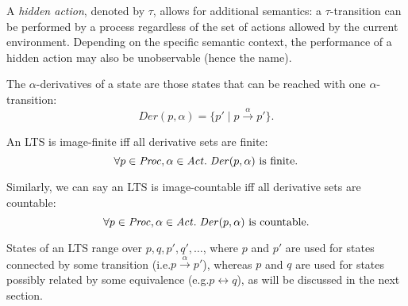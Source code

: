 \begin{isabellebody}
\begin{isamarkuptext}
{}

A \emph{hidden action}, denoted by $\tau$, allows for additional semantics: a $\tau$-transition can be performed by a process regardless of the set of actions allowed by the current environment. Depending on the specific semantic context, the performance of a hidden action may also be unobservable (hence the name).%
\end{isamarkuptext}\isamarkuptrue%
%
\isadelimdocument
%
\endisadelimdocument
%
\isatagdocument
%
\isamarkuptrue%
%
\endisatagdocument
{\isafolddocument}%
%
\isadelimdocument
%
\endisadelimdocument
%
\begin{isamarkuptext}%
The $\alpha$-derivatives of a state are those states that can be reached with one $\alpha$-transition:
$$\mathit{Der}(p, \alpha) = \{ p' \mid p \xrightarrow{\alpha} p' \}.$$

An LTS is image-finite iff all derivative sets are finite:
$$\forall p \in \mathit{Proc}, \alpha \in \mathit{Act} .\; \mathit{Der}(p, \alpha) \text{ is finite}.$$

Similarly, we can say an LTS is image-countable iff all derivative sets are countable:
$$\forall p \in \mathit{Proc}, \alpha \in \mathit{Act} .\; \mathit{Der}(p, \alpha) \text{ is countable}.$$%
\end{isamarkuptext}\isamarkuptrue%
%
\isadelimdocument
%
\endisadelimdocument
%
\isatagdocument
%
\isamarkuptrue%
%
\endisatagdocument
{\isafolddocument}%
%
\isadelimdocument
%
\endisadelimdocument
%
\begin{isamarkuptext}%
States of an LTS range over $p, q, p', q', \dots$, where $p$ and $p'$ are used for states connected by some transition (i.e.\@ $p \xrightarrow{\alpha} p'$), whereas $p$ and $q$ are used for states possibly related by some equivalence (e.g.\@ $p \leftrightarrow q$), as will be discussed in the next section.


\end{isamarkuptext}
\end{isabellebody}
